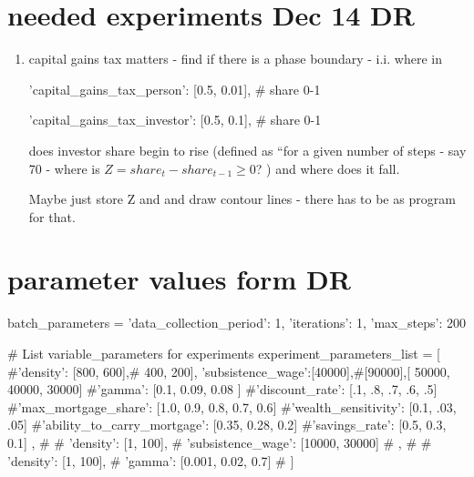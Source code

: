 \section{needed experiments Dec 14 DR}
\begin{enumerate}
    \item capital gains tax matters - find if there is a phase boundary - i.i. where in 

            'capital_gains_tax_person': [0.5, 0.01], # share 0-1

            'capital_gains_tax_investor': [0.5, 0.1], # share 0-1

            does investor share begin to rise (defined as ``for a given number of steps - say 70 - where is $Z=share_t - share_{t-1} \ge 0$? ) and where does it fall.

Maybe just store Z and and draw contour lines - there has to be as program for that.
\end{enumerate}
\section{parameter values form DR}
batch_parameters = {
            'data_collection_period': 1,
            'iterations': 1,
            'max_steps': 200
}

# List variable_parameters for experiments
    experiment_parameters_list = [
         {
            #'density': [800, 600],# 400, 200],
            'subsistence_wage':[40000],#[90000],[ 50000, 40000, 30000]
            #'gamma': [0.1, 0.09, 0.08 ]
            #'discount_rate': [.1, .8, .7, .6, .5]
            #'max_mortgage_share': [1.0, 0.9, 0.8, 0.7, 0.6]
            #'wealth_sensitivity': [0.1, .03, .05]
            #'ability_to_carry_mortgage': [0.35, 0.28, 0.2]
            #'savings_rate': [0.5, 0.3, 0.1]
        },
        # {
        #     'density': [1, 100],
        #     'subsistence_wage': [10000, 30000]
        # },
        # {
        #     'density': [1, 100],
        #     'gamma': [0.001, 0.02, 0.7]
        # }
    ]
    
